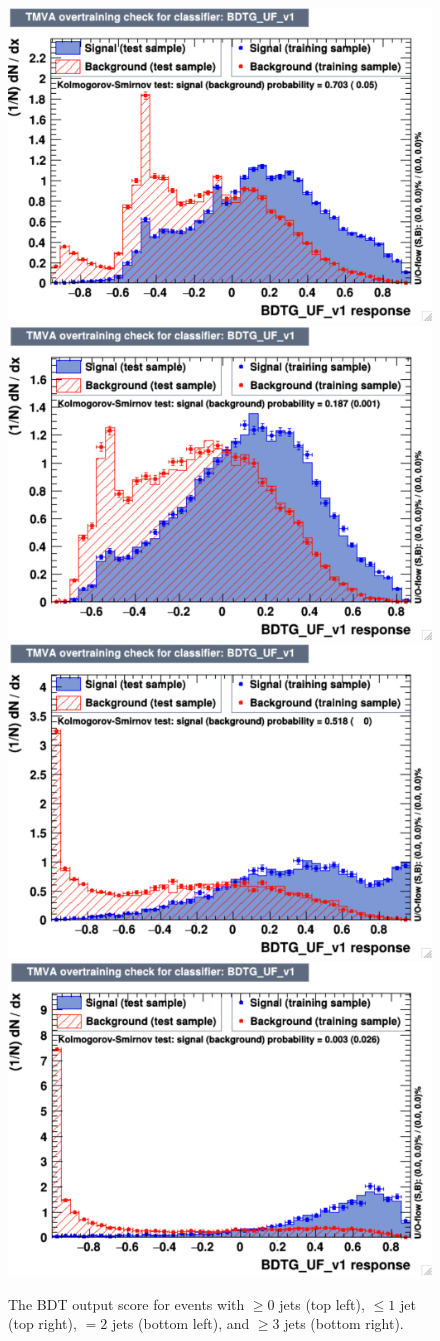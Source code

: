 \begin{figure}
  \includegraphics[width=0.5\linewidth]{figures/bdt_training/BDT_out_ge0j_all.pdf}
  \includegraphics[width=0.5\linewidth]{figures/bdt_training/BDT_out_le1j_all.pdf}
  \includegraphics[width=0.5\linewidth]{figures/bdt_training/BDT_out_eq2j_all.pdf}
  \includegraphics[width=0.5\linewidth]{figures/bdt_training/BDT_out_ge3j_all.pdf}
  \caption{The BDT output score for events with $\ge 0$ jets (top left), $\leq 1$ jet (top right),
           $= 2$ jets (bottom left), and $\ge 3$ jets (bottom right).}
  \label{fig:BDT_out}
\end{figure}

